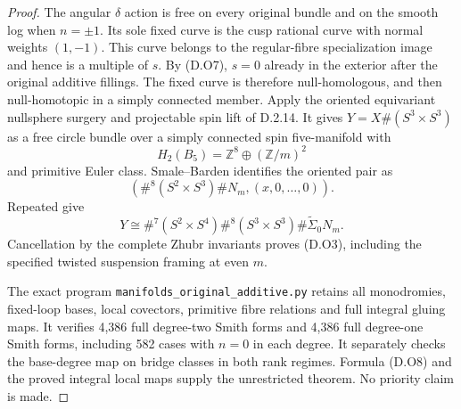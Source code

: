 \begin{proof}
The angular $\delta$ action is free on every original
bundle and on the smooth log when $n=\pm1$. Its sole
fixed curve is the cusp rational curve with normal
weights $(1,-1)$. This curve belongs to the regular-fibre
specialization image and hence is a multiple of $s$.
By (D.O7), $s=0$ already in the exterior after the
original additive fillings. The fixed curve is therefore
null-homologous, and then null-homotopic in a simply
connected member.
Apply the oriented equivariant nullsphere surgery and
projectable spin lift of D.2.14. It gives
$Y=X\#(S^3\times S^3)$ as a free circle bundle over a
simply connected spin five-manifold with
\[
            H_2(B_5)=\mathbb Z^8\oplus(\mathbb Z/m)^2
\]
and primitive Euler class. Smale--Barden identifies the
oriented pair as
\[
 (\#^8(S^2\times S^3)\#N_m,(x,0,\ldots,0)).
\]
Repeated \cite[Theorem A and Theorem B(2)]{manGR25}
give
\[
 Y\cong\#^7(S^2\times S^4)\#^8(S^3\times S^3)
                                        \#\widetilde\Sigma_0N_m.
\]
Cancellation by the complete Zhubr invariants proves
(D.O3), including the specified twisted suspension
framing at even $m$.

The exact program \texttt{manifolds\_original\_additive.py}
retains all monodromies, fixed-loop bases, local covectors,
primitive fibre relations and full integral gluing maps.
It verifies 4,386 full degree-two Smith forms and 4,386
full degree-one Smith forms, including 582 cases with
$n=0$ in each degree. It separately checks the base-degree
map on bridge classes in both rank regimes. Formula
(D.O8) and the proved integral local maps supply the
unrestricted theorem. No priority claim is made.
\end{proof}

